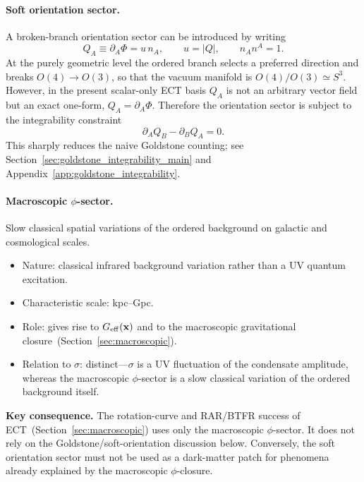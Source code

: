 \documentclass[11pt,a4paper]{article}
\numberwithin{equation}{section}
\begin{document}
\paragraph{Soft orientation sector.}
A broken-branch orientation sector can be introduced by writing
\begin{equation}
  Q_A \equiv \partial_A\Phi = u\,n_A,
  \qquad u = |Q|, \qquad n_A n^A = 1.
  \label{eq:QA_un_decomp}
\end{equation}
At the purely geometric level the ordered branch selects a preferred
direction and breaks $O(4)\to O(3)$, so that the vacuum manifold is
$O(4)/O(3)\simeq S^3$.
However, in the present scalar-only ECT basis $Q_A$ is not an arbitrary
vector field but an exact one-form, $Q_A=\partial_A\Phi$.
Therefore the orientation sector is subject to the integrability
constraint
\begin{equation}
  \partial_A Q_B - \partial_B Q_A = 0.
  \label{eq:integrability_main}
\end{equation}
This sharply reduces the naive Goldstone counting;
see Section~\ref{sec:goldstone_integrability_main} and
Appendix~\ref{app:goldstone_integrability}.

\paragraph{Macroscopic $\phi$-sector.}
Slow classical spatial variations of the ordered background on galactic
and cosmological scales.
\begin{itemize}
  \item Nature: classical infrared background variation rather than a
    UV quantum excitation.
  \item Characteristic scale: kpc--Gpc.
  \item Role: gives rise to $G_{\rm eff}(\mathbf{x})$ and to the
    macroscopic gravitational closure~(Section~\ref{sec:macroscopic}).
  \item Relation to $\sigma$: distinct---$\sigma$ is a UV fluctuation of
    the condensate amplitude, whereas the macroscopic $\phi$-sector is a
    slow classical variation of the ordered background itself.
\end{itemize}

\medskip
\noindent\textbf{Key consequence.}
The rotation-curve and RAR/BTFR success of ECT~(Section~\ref{sec:macroscopic})
uses only the macroscopic $\phi$-sector.
It does not rely on the Goldstone/soft-orientation discussion below.
Conversely, the soft orientation sector must not be used as a
dark-matter patch for phenomena already explained by the macroscopic
$\phi$-closure.
\end{document}
